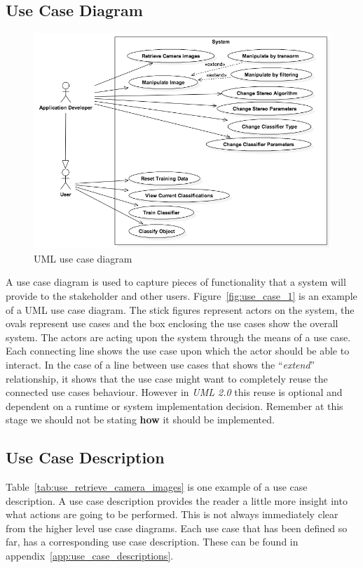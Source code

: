 \documentclass[11pt,oneside]{report}
\begin{document}
			\subsection{Use Case Diagram}
			
			\begin{figure}[ht]
			\begin{center}
    				\includegraphics[width=\textwidth]{use_case_2}
    			\caption{UML use case diagram \protect {\label{fig:use_case_1}}}
    			\end{center}
			\end{figure}	
			A use case diagram is used to capture pieces of functionality that a system will provide to the stakeholder and other users.
			Figure~\ref{fig:use_case_1} is an example of a UML use case diagram.
			The stick figures represent actors on the system, the ovals represent use cases and the box enclosing the use cases show the overall system. 
			The actors are acting upon the system through the means of a use case.
			Each connecting line shows the use case upon which the actor should be able to interact.
			In the case of a line between use cases that shows the ``\textit{extend}'' relationship, it shows that the use case might want to completely reuse the connected use cases behaviour.
			However in \textit{UML 2.0} this reuse is optional and dependent on a runtime or system implementation decision.
			Remember at this stage we should not be stating \textbf{how} it should be implemented.
			\subsection{Use Case Description}
			Table~\ref{tab:use_retrieve_camera_images} is one example of a use case description.
			A use case description provides the reader a little more insight into what actions are going to be performed.
			This is not always immediately clear from the higher level use case diagrams.
			Each use case that has been defined so far, has a corresponding use case description.
			These can be found in appendix~\ref{app:use_case_descriptions}.
			
		\clearpage
\end{document}
